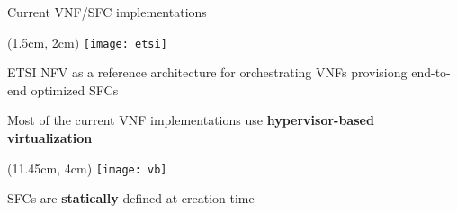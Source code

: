 \begin{frame}{Current VNF/SFC implementations}

  \vspace{1cm}

  \begin{textblock*}{1cm}(1.5cm, 2cm)
    \texttt{[image: etsi]}
  \end{textblock*}

  ETSI NFV as a reference architecture for orchestrating VNFs provisiong
  end-to-end optimized SFCs

  \vfill{}

  Most of the current VNF implementations use \textbf{hypervisor-based
  virtualization}

  \begin{textblock*}{1cm}(11.45cm, 4cm)
    \texttt{[image: vb]}
  \end{textblock*}

  \vfill{}

  SFCs are \textbf{statically} defined at creation time

  \vfill{}

\end{frame}